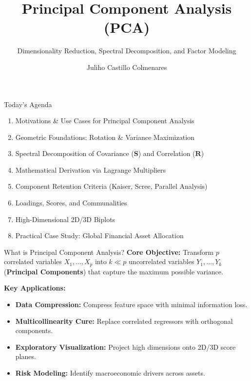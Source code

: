 \documentclass[aspectratio=169,ignorenonframetext]{beamer}
\title{\texorpdfstring{Principal Component Analysis
(PCA)}{Principal Component Analysis (PCA)}}
\author{\texorpdfstring{Juliho Castillo
Colmenares}{Juliho Castillo Colmenares}}
\subtitle{Dimensionality Reduction, Spectral Decomposition, and Factor Modeling}
\institute{Tec de Monterrey}
\date{}
\begin{document}
\frame{\titlepage}

\begin{frame}{Today's Agenda}
\begin{enumerate}
\item
  Motivations \& Use Cases for Principal Component Analysis
\item
  Geometric Foundations: Rotation \& Variance Maximization
\item
  Spectral Decomposition of Covariance (\(\mathbf{S}\)) and Correlation
  (\(\mathbf{R}\))
\item
  Mathematical Derivation via Lagrange Multipliers
\item
  Component Retention Criteria (Kaiser, Scree, Parallel Analysis)
\item
  Loadings, Scores, and Communalities
\item
  High-Dimensional 2D/3D Biplots
\item
  Practical Case Study: Global Financial Asset Allocation
\end{enumerate}
\end{frame}

\begin{frame}{What is Principal Component Analysis?}
\textbf{Core Objective:} Transform \(p\) correlated variables
\(X_{1},\ldots,X_{p}\) into \(k \ll p\) uncorrelated variables
\(Y_{1},\ldots,Y_{k}\) (\textbf{Principal Components}) that capture the
maximum possible variance.

\textbf{Key Applications:}

\begin{itemize}
\item
  \textbf{Data Compression:} Compress feature space with minimal
  information loss.
\item
  \textbf{Multicollinearity Cure:} Replace correlated regressors with
  orthogonal components.
\item
  \textbf{Exploratory Visualization:} Project high dimensions onto 2D/3D
  score planes.
\item
  \textbf{Risk Modeling:} Identify macroeconomic drivers across assets.
\end{itemize}
\end{frame}
\end{document}
